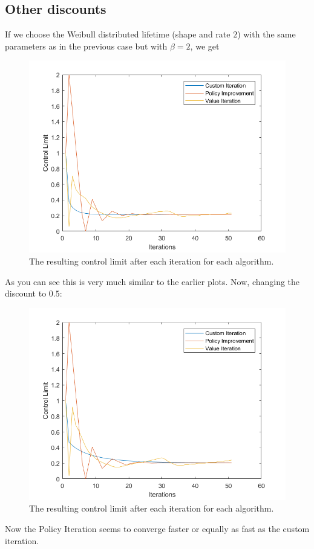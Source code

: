 \subsection{Other discounts}
If we choose the Weibull distributed lifetime (shape and rate $2$) with the same parameters as in the previous case but with $\beta=2$, we get
\begin{figure}[H]
\centering
\includegraphics[width=\textwidth]{Plots/CL Weibull2-2 Discount-2 Start-1.png}
\caption{The resulting control limit after each iteration for each algorithm.}
\end{figure}
As you can see this is very much similar to the earlier plots.
Now, changing the discount to $0.5$:
\begin{figure}[H]
\centering
\includegraphics[width=\textwidth]{Plots/CL Weibull2-2 Discount-0.5 Start-1.png}
\caption{The resulting control limit after each iteration for each algorithm.}
\end{figure}
Now the Policy Iteration seems to converge faster or equally as fast as the custom iteration.
